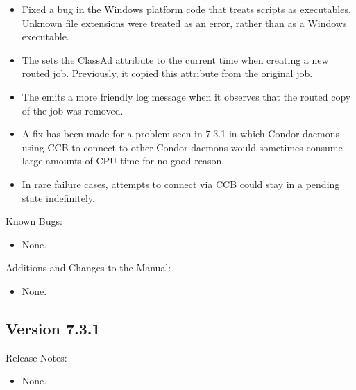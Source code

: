 \begin{itemize}

\item Fixed a bug in the Windows platform code that treats scripts as
  executables.
  Unknown file extensions were treated as an error,
  rather than as a Windows executable.

\item The  sets the ClassAd attribute
 to the current time when creating a new routed job.
Previously, it copied this attribute from the original job.

\item The  emits a more friendly log message when it
observes that the routed copy of the job was removed.

\item A fix has been made for a problem seen in 7.3.1 in which Condor daemons
using CCB to connect to other Condor daemons would sometimes consume
large amounts of CPU time for no good reason.

\item In rare failure cases, attempts to connect via CCB could stay in
a pending state indefinitely.

\end{itemize}

\noindent Known Bugs:

\begin{itemize}

\item None.

\end{itemize}

\noindent Additions and Changes to the Manual:

\begin{itemize}

\item None.

\end{itemize}


\subsection*{\label{sec:New-7-3-1}Version 7.3.1}

\noindent Release Notes:

\begin{itemize}

\item None.

\end{itemize}


